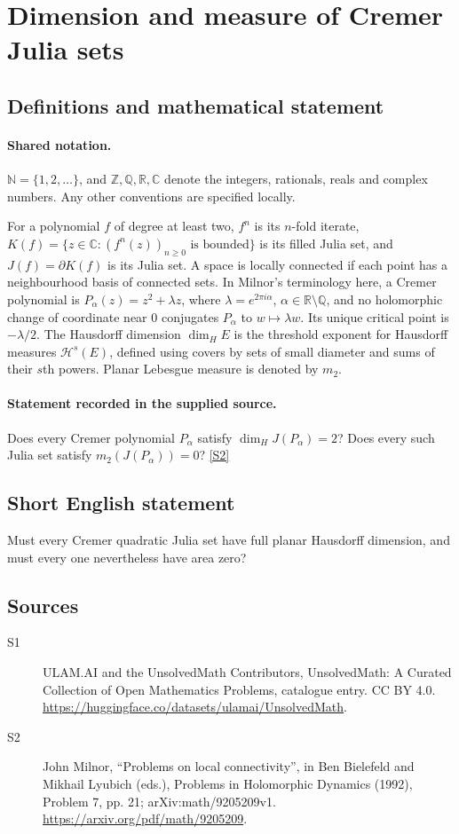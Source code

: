 \documentclass[11pt]{article}
\newcommand{\sref}[2]{\hyperlink{source:#1:#2}{[S#2]}}
\begin{document}
\section{Dimension and measure of Cremer Julia sets}\label{statement}

\subsection{Definitions and mathematical statement}

\paragraph{Shared notation.}$\mathbb N=\{1,2,\ldots\}$, and $\mathbb Z,\mathbb Q,\mathbb R,\mathbb C$ denote the integers, rationals, reals and complex numbers. Any other conventions are specified locally.


For a polynomial $f$ of degree at least two, $f^n$ is its $n$-fold iterate, $K(f)=\{z\in\mathbb C:(f^n(z))_{n\geq0}\text{ is bounded}\}$ is its filled Julia set, and $J(f)=\partial K(f)$ is its Julia set. A space is locally connected if each point has a neighbourhood basis of connected sets. In Milnor's terminology here, a Cremer polynomial is $P_\alpha(z)=z^2+\lambda z$, where $\lambda=e^{2\pi i\alpha}$, $\alpha\in\mathbb R\setminus\mathbb Q$, and no holomorphic change of coordinate near $0$ conjugates $P_\alpha$ to $w\mapsto\lambda w$. Its unique critical point is $-\lambda/2$. The Hausdorff dimension $\dim_H E$ is the threshold exponent for Hausdorff measures $\mathcal H^s(E)$, defined using covers by sets of small diameter and sums of their $s$th powers. Planar Lebesgue measure is denoted by $m_2$.
\paragraph{Statement recorded in the supplied source.}
Does every Cremer polynomial $P_\alpha$ satisfy $\dim_HJ(P_\alpha)=2$? Does every such Julia set satisfy $m_2(J(P_\alpha))=0$? \sref{statement}{2}
\subsection{Short English statement}
Must every Cremer quadratic Julia set have full planar Hausdorff dimension, and must every one nevertheless have area zero?
\subsection{Sources}
\begin{description}
\item[\hypertarget{source:statement:1}{S1}] ULAM.AI and the UnsolvedMath Contributors, UnsolvedMath: A Curated Collection of Open Mathematics Problems, catalogue entry. CC BY 4.0. \url{https://huggingface.co/datasets/ulamai/UnsolvedMath}.
\item[\hypertarget{source:statement:2}{S2}] John Milnor, ``Problems on local connectivity'', in Ben Bielefeld and Mikhail Lyubich (eds.), Problems in Holomorphic Dynamics (1992), Problem 7, pp. 21; arXiv:math/9205209v1. \url{https://arxiv.org/pdf/math/9205209}.
\end{description}
\label{end:statement}
\end{document}
